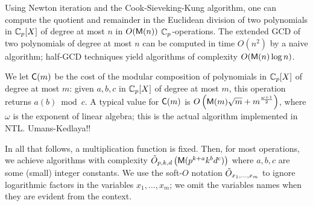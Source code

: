 Using Newton iteration and the Cook-Sieveking-Kung algorithm, one can
compute the quotient and remainder in the Euclidean division of two
polynomials in $\mathbb{C}_p[X]$ of degree at most $n$ in $O(\mathrm{\sf M}(n))$
$\mathbb{C}_p$-operations. The extended GCD of two polynomials of degree at
most $n$ can be computed in time $O(n^2)$ by a naive algorithm;
half-GCD techniques yield algorithms of complexity $O(\mathrm{\sf M}(n)\log
n)$.

We let $\mathrm{\sf C}(m)$ be the cost of the modular composition of
polynomials in $\mathbb{C}_p[X]$ of degree at most $m$: given $a,b,c$ in
$\mathbb{C}_p[X]$ of degree at most $m$, this operation returns $a(b) \bmod
c$.  A typical value for $\mathrm{\sf C}(m)$ is $O\left(\mathrm{\sf M}(m)\sqrt{m} +
  m^\frac{\omega+1}{2}\right)$, where $\omega$ is the exponent of
linear algebra; this is the actual algorithm implemented in NTL.
Umans-Kedlaya!!

In all that follows, a multiplication function is fixed. Then, for
most operations, we achieve algorithms with complexity
$\tilde{O}_{p,k,d}\left(\mathrm{\sf M}(p^{k+a}k^{b}d^{c})\right)$ where $a,b,c$
are some (small) integer constants. We use the soft-$O$ notation
$\tilde{O}_{x_1,\ldots,x_m}$ to ignore logarithmic factors in the
variables $x_1,\ldots,x_m$; we omit the variables names when they are
evident from the context.

%
